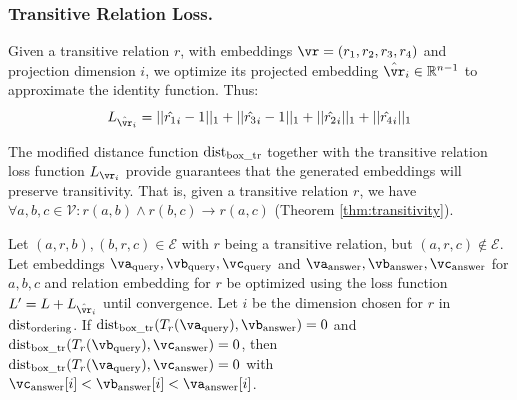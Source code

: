 \documentclass[runningheads]{llncs}
\newcommand{\proj}[2]{\hat{#1}_{#2}}
\newcommand{\dist}[1]{\mbox{dist}_{\scriptsize \mbox{#1}}}
\newcommand{\query}[1]{#1_{\mbox{\scriptsize query}}}
\newcommand{\answer}[1]{#1_{\mbox{\scriptsize answer}}}
\renewcommand{\paragraph}[1]{\subsubsection{#1}}
\begin{document}
\paragraph{Transitive Relation Loss.} Given a transitive relation $r$, with
embeddings $\vr = (r_1, r_2, r_3, r_4)$ and projection dimension $i$,
we optimize its projected embedding $\proj{\vr}{i} \in \mathbb{R}^{n-1}$ to approximate the
identity function. Thus:
\begin{equation}
  \label{eq:reg_loss}
  L_{\proj{\vr}{i}} = ||\proj{r_1}{i}-1||_1 + ||\proj{r_3}{i}-1||_1 +
  ||\proj{r_2}{i}||_1 + ||\proj{r_4}{i}||_1
\end{equation}

The modified distance function $\dist{box\_tr}$ together with the
transitive relation loss function $L_{\vr_i}$ provide guarantees that the
generated embeddings will preserve transitivity. That is, given a
transitive relation $r$, we have
$\forall a,b,c \in \mathcal{V}: r(a,b) \land r(b,c) \to r(a,c)$
(Theorem \ref{thm:transitivity}).

\begin{theorem}
  \label{thm:transitivity}
  Let $(a,r,b), (b,r,c) \in \mathcal{E}$ with $r$ being a transitive
  relation, but $(a,r,c) \not\in \mathcal{E}$. Let embeddings
  $\query{\va}, \query{\vb}, \query{\vc}$ and
  $\answer{\va}, \answer{\vb}, \answer{\vc}$ for $a,b,c$ and relation
  embedding for $r$ be optimized using the loss function
  $L' = L + L_{\proj{\vr}{i}}$ until convergence. Let $i$ be the
  dimension chosen for $r$ in $\dist{ordering}$. If
  $\dist{box\_tr}(T_r(\query{\va}), \answer{\vb}) = 0$ and
  $\dist{box\_tr}(T_r(\query{\vb}), \answer{\vc}) = 0$, then
  $\dist{box\_tr}(T_r(\query{\va}), \answer{\vc}) = 0$ with
  $\answer{\vc}[i] < \answer{\vb}[i] < \answer{\va}[i]$.
\end{theorem}
\end{document}
